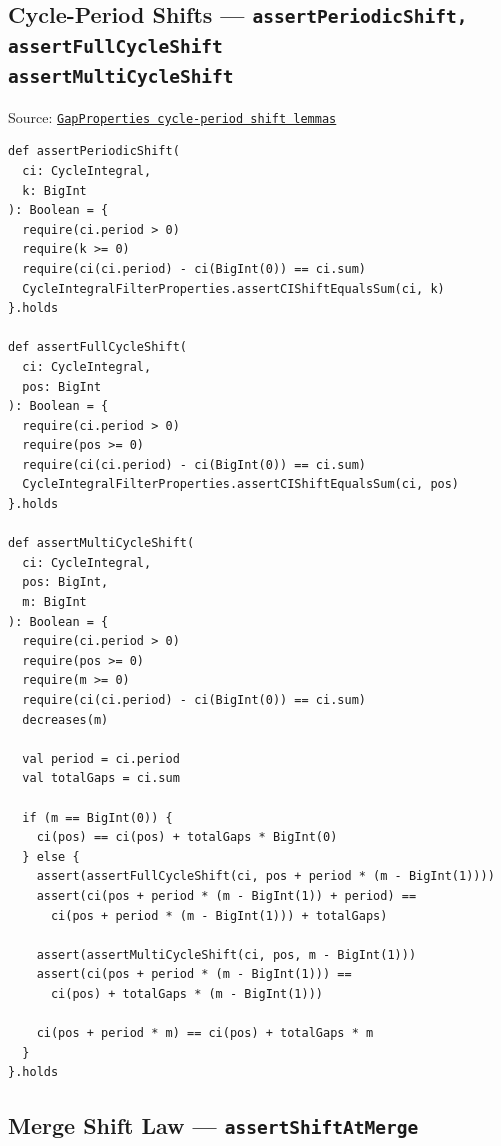 \subsection{Cycle-Period Shifts --- \texorpdfstring{\texttt{assert\allowbreak Periodic\allowbreak Shift, assert\allowbreak Full\allowbreak Cycle\allowbreak Shift}\\ 
\texttt{assert\allowbreak Multi\allowbreak Cycle\allowbreak Shift}}{assertPeriodicShift, assertFullCycleShift, assertMultiCycleShift}}

{\raggedright Source: \href{https://github.com/thiagomata/prime-numbers/blob/integral-cycle-article-v1.0.0/src/main/scala/v1/chapter4/cycle/integral/recursive/properties/GapProperties.scala}{\texttt{Gap\allowbreak Properties cycle-period shift lemmas}}\par}

\begin{lstlisting}[style=scala]
def assertPeriodicShift(
  ci: CycleIntegral,
  k: BigInt
): Boolean = {
  require(ci.period > 0)
  require(k >= 0)
  require(ci(ci.period) - ci(BigInt(0)) == ci.sum)
  CycleIntegralFilterProperties.assertCIShiftEqualsSum(ci, k)
}.holds

def assertFullCycleShift(
  ci: CycleIntegral,
  pos: BigInt
): Boolean = {
  require(ci.period > 0)
  require(pos >= 0)
  require(ci(ci.period) - ci(BigInt(0)) == ci.sum)
  CycleIntegralFilterProperties.assertCIShiftEqualsSum(ci, pos)
}.holds

def assertMultiCycleShift(
  ci: CycleIntegral,
  pos: BigInt,
  m: BigInt
): Boolean = {
  require(ci.period > 0)
  require(pos >= 0)
  require(m >= 0)
  require(ci(ci.period) - ci(BigInt(0)) == ci.sum)
  decreases(m)

  val period = ci.period
  val totalGaps = ci.sum

  if (m == BigInt(0)) {
    ci(pos) == ci(pos) + totalGaps * BigInt(0)
  } else {
    assert(assertFullCycleShift(ci, pos + period * (m - BigInt(1))))
    assert(ci(pos + period * (m - BigInt(1)) + period) ==
      ci(pos + period * (m - BigInt(1))) + totalGaps)

    assert(assertMultiCycleShift(ci, pos, m - BigInt(1)))
    assert(ci(pos + period * (m - BigInt(1))) ==
      ci(pos) + totalGaps * (m - BigInt(1)))

    ci(pos + period * m) == ci(pos) + totalGaps * m
  }
}.holds
\end{lstlisting}

\subsection{Merge Shift Law --- \texorpdfstring{\texttt{assert\allowbreak Shift\allowbreak At\allowbreak Merge}}{assertShiftAtMerge}}

